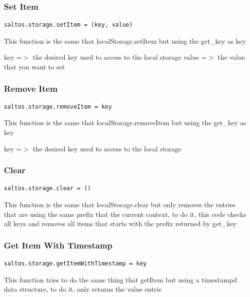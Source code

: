 \documentclass[a4paper]{article}
\begin{document}
\subsubsection{Set Item}

\begin{lstlisting}
saltos.storage.setItem = (key, value)
\end{lstlisting}

This function is the same that localStorage.setItem but using the get\_key as key

key   =$>$ the desired key used to access to the local storage
value =$>$ the value that you want to set

\hypertarget{toc292}{}
\subsubsection{Remove Item}

\begin{lstlisting}
saltos.storage.removeItem = key
\end{lstlisting}

This function is the same that localStorage.removeItem but using the get\_key as key

key =$>$ the desired key used to access to the local storage

\hypertarget{toc293}{}
\subsubsection{Clear}

\begin{lstlisting}
saltos.storage.clear = ()
\end{lstlisting}

This function is the same that localStorage.clear but only removes the entries that
are using the same prefix that the current context, to do it, this code checks all
keys and removes all items that starts with the prefix returned by get\_key

\hypertarget{toc294}{}
\subsubsection{Get Item With Timestamp}

\begin{lstlisting}
saltos.storage.getItemWithTimestamp = key
\end{lstlisting}

This function tries to do the same thing that getItem but using a timestampd data
structure, to do it, only returns the value entrie
\end{document}
